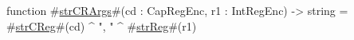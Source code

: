 function #\hyperref[sailMIPSzstrCRArgs]{strCRArgs}#(cd : CapRegEnc, r1 : IntRegEnc) -> string = #\hyperref[sailMIPSzstrCReg]{strCReg}#(cd) ^ ", " ^ #\hyperref[sailMIPSzstrReg]{strReg}#(r1)
